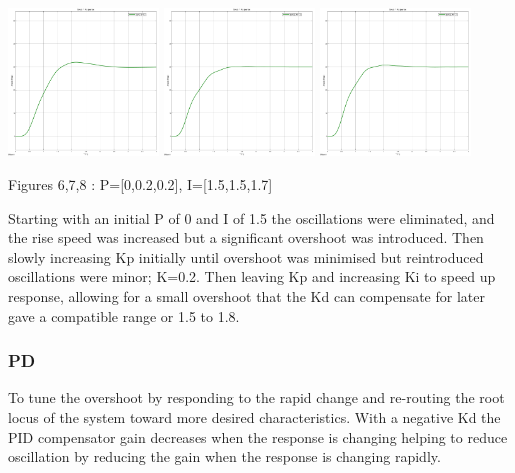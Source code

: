 \documentclass[a4paper,11pt]{article}
\begin{document}
\includegraphics[width=0.3\textwidth]{inc/PI_0.png}
\includegraphics[width=0.3\textwidth]{inc/PI_1.png}
\includegraphics[width=0.3\textwidth]{inc/PI_2.png}
\begin{center}
        Figures 6,7,8 : P=[0,0.2,0.2], I=[1.5,1.5,1.7]
\end{center}

Starting with an initial P of 0 and I of 1.5 the oscillations were eliminated, and the rise speed was increased but a significant overshoot was introduced. Then slowly increasing Kp initially until overshoot was minimised but reintroduced oscillations were minor; K=0.2. Then leaving Kp and increasing Ki to speed up response, allowing for a small overshoot that the Kd can compensate for later gave a compatible range or 1.5 to 1.8. 

\newpage
\subsubsection{PD}
To tune the overshoot by responding to the rapid change and re-routing the root locus of the system toward more desired characteristics. With a negative Kd the PID compensator gain decreases when the response is changing helping to reduce oscillation by reducing the gain when the response is changing rapidly. 
\end{document}
